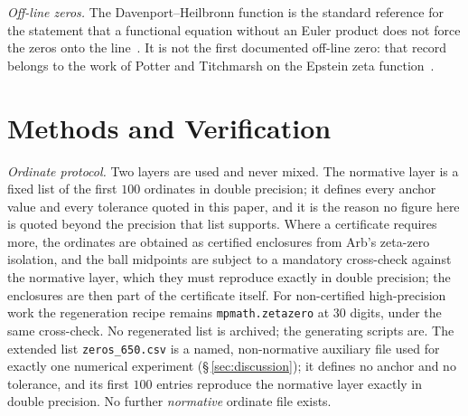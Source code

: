 \documentclass[11pt]{article}
\begin{document}
\emph{Off-line zeros.} The Davenport--Heilbronn function is the standard
reference for the statement that a functional equation without an Euler
product does not force the zeros onto the line~\cite{DavenportHeilbronn36}. It
is not the first documented off-line zero: that record belongs to the work of
Potter and Titchmarsh on the Epstein zeta function~\cite{PotterTitchmarsh35,
Epstein03}.

\section{Methods and Verification}
\label{sec:methods}

\emph{Ordinate protocol.} Two layers are used and never mixed. The normative
layer is a fixed list of the first $100$ ordinates in double precision; it
defines every anchor value and every tolerance quoted in this paper, and it is
the reason no figure here is quoted beyond the precision that list supports.
Where a certificate requires more, the ordinates are obtained as certified
enclosures from Arb's zeta-zero isolation, and the ball midpoints are subject
to a mandatory cross-check against the normative layer, which they must
reproduce exactly in double precision; the enclosures are then part of the
certificate itself. For non-certified high-precision work the regeneration
recipe remains \texttt{mpmath.zetazero} at $30$ digits, under the same
cross-check. No regenerated list is archived; the generating scripts are.
The extended list \texttt{zeros\_650.csv} is a named, non-normative
auxiliary file used for exactly one numerical experiment
(\S\,\ref{sec:discussion}); it defines no anchor and no tolerance, and its
first $100$ entries reproduce the normative layer exactly in double
precision. No further \emph{normative} ordinate file exists.
\end{document}
